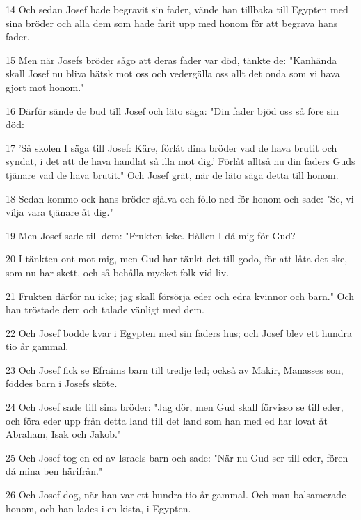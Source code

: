 \par 14 Och sedan Josef hade begravit sin fader, vände han tillbaka till Egypten med sina bröder och alla dem som hade farit upp med honom för att begrava hans fader.
\par 15 Men när Josefs bröder sågo att deras fader var död, tänkte de: "Kanhända skall Josef nu bliva hätsk mot oss och vedergälla oss allt det onda som vi hava gjort mot honom."
\par 16 Därför sände de bud till Josef och läto säga: "Din fader bjöd oss så före sin död:
\par 17 'Så skolen I säga till Josef: Käre, förlåt dina bröder vad de hava brutit och syndat, i det att de hava handlat så illa mot dig.' Förlåt alltså nu din faders Guds tjänare vad de hava brutit." Och Josef grät, när de läto säga detta till honom.
\par 18 Sedan kommo ock hans bröder själva och föllo ned för honom och sade: "Se, vi vilja vara tjänare åt dig."
\par 19 Men Josef sade till dem: "Frukten icke. Hållen I då mig för Gud?
\par 20 I tänkten ont mot mig, men Gud har tänkt det till godo, för att låta det ske, som nu har skett, och så behålla mycket folk vid liv.
\par 21 Frukten därför nu icke; jag skall försörja eder och edra kvinnor och barn." Och han tröstade dem och talade vänligt med dem.
\par 22 Och Josef bodde kvar i Egypten med sin faders hus; och Josef blev ett hundra tio år gammal.
\par 23 Och Josef fick se Efraims barn till tredje led; också av Makir, Manasses son, föddes barn i Josefs sköte.
\par 24 Och Josef sade till sina bröder: "Jag dör, men Gud skall förvisso se till eder, och föra eder upp från detta land till det land som han med ed har lovat åt Abraham, Isak och Jakob."
\par 25 Och Josef tog en ed av Israels barn och sade: "När nu Gud ser till eder, fören då mina ben härifrån."
\par 26 Och Josef dog, när han var ett hundra tio år gammal. Och man balsamerade honom, och han lades i en kista, i Egypten.


